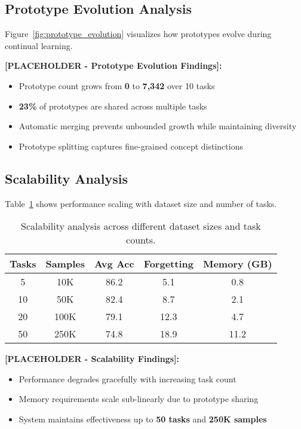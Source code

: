 \documentclass{article}
\begin{document}
\subsection{Prototype Evolution Analysis}

Figure~\ref{fig:prototype_evolution} visualizes how prototypes evolve during continual learning.

\textbf{[PLACEHOLDER - Prototype Evolution Findings]:}
\begin{itemize}
\item Prototype count grows from \textbf{0} to \textbf{7,342} over 10 tasks
\item \textbf{23\%} of prototypes are shared across multiple tasks
\item Automatic merging prevents unbounded growth while maintaining diversity
\item Prototype splitting captures fine-grained concept distinctions
\end{itemize}

\subsection{Scalability Analysis}

Table~\ref{tab:scalability} shows performance scaling with dataset size and number of tasks.

\begin{table}[t]
\centering
\caption{Scalability analysis across different dataset sizes and task counts.}
\label{tab:scalability}
\begin{tabular}{c|c|ccc}
\toprule
Tasks & Samples & Avg Acc & Forgetting & Memory (GB) \\
\midrule
5 & 10K & 86.2 & 5.1 & 0.8 \\
10 & 50K & 82.4 & 8.7 & 2.1 \\
20 & 100K & 79.1 & 12.3 & 4.7 \\
50 & 250K & 74.8 & 18.9 & 11.2 \\
\bottomrule
\end{tabular}
\end{table}

\textbf{[PLACEHOLDER - Scalability Findings]:}
\begin{itemize}
\item Performance degrades gracefully with increasing task count
\item Memory requirements scale sub-linearly due to prototype sharing
\item System maintains effectiveness up to \textbf{50 tasks} and \textbf{250K samples}
\end{itemize}
\end{document}
